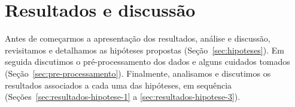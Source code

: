 \section{Resultados e discussão}
\label{sec:resultados}

Antes de começarmos a apresentação dos resultados, análise e discussão, revisitamos e detalhamos as hipóteses propostas (Seção~\ref{sec:hipoteses}).
Em seguida discutimos o pré-processamento dos dados e alguns cuidados tomados (Seção~\ref{sec:pre-processamento}).
Finalmente, analisamos e discutimos os resultados associados a cada uma das hipóteses, em sequência (Seções~\ref{sec:resultados-hipotese-1} a \ref{sec:resultados-hipotese-3}).








